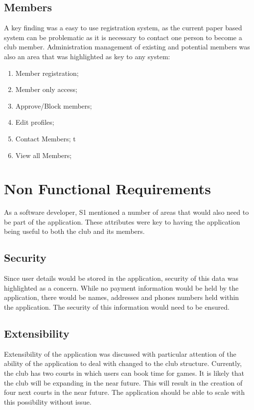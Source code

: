 \subsection{Members}

A key finding was a easy to use registration system, as the current paper based system can be problematic as it is necessary to contact one person to become a club member. Administration management of existing and potential members was also an area that was highlighted as key to any system:

\begin{enumerate}
\item Member registration;
\item Member only access;
\item Approve/Block members;
\item Edit profiles;
\item Contact Members;
t\item View all Members;
\end{enumerate}

\section{Non Functional Requirements}

As a software developer, S1 mentioned a number of areas that would also need to be part of the application. These attributes were key to having the application being useful to both the club and its members.

\subsection{Security}

Since user details would be stored in the application, security of this data was highlighted as a concern. While no payment information would be held by the application, there would be names, addresses and phones numbers held within the application. The security of this information would need to be ensured.

\subsection{Extensibility}

Extensibility of the application was discussed with particular attention of the ability of the application to deal with changed to the club structure. Currently, the club has two courts in which users can book time for games. It is likely that the club will be expanding in the near future. This will result in the creation of four next courts in the near future. The application should be able to scale with this possibility without issue.

